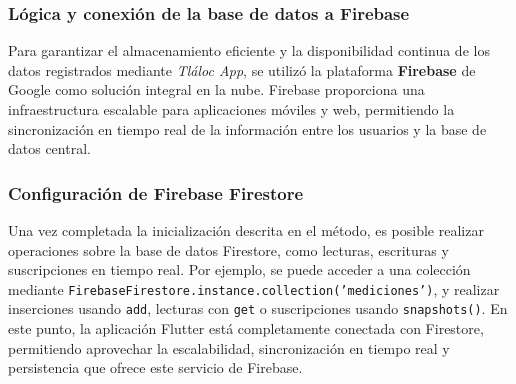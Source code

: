 \begin{table}[h!]
    \centering
    \caption{Funciones Clave de Firebase en el Código. Fuente: Elaboración propia (2025)}
    \label{tabt2}
    \end{table}






\subsubsection{Lógica y conexión de la base de datos a Firebase}

 

Para garantizar el almacenamiento eficiente y la disponibilidad continua de los datos registrados mediante \textit{Tláloc App}, se utilizó la plataforma \textbf{Firebase} de Google como solución integral en la nube. Firebase proporciona una infraestructura escalable para aplicaciones móviles y web, permitiendo la sincronización en tiempo real de la información entre los usuarios y la base de datos central.

\subsubsection*{Configuración de Firebase Firestore}

Una vez completada la inicialización descrita en el método, es posible realizar operaciones sobre la base de datos Firestore, como lecturas, escrituras y suscripciones en tiempo real. Por ejemplo, se puede acceder a una colección mediante \texttt{FirebaseFirestore.instance.collection('mediciones')}, y realizar inserciones usando \texttt{add}, lecturas con \texttt{get} o suscripciones usando \texttt{snapshots()}. En este punto, la aplicación Flutter está completamente conectada con Firestore, permitiendo aprovechar la escalabilidad, sincronización en tiempo real y persistencia que ofrece este servicio de Firebase.



